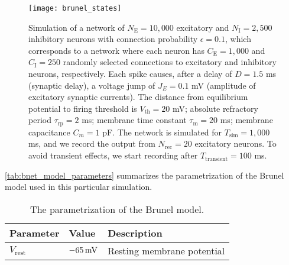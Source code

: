 \begin{figure}[H]
    \centering
    \texttt{[image: brunel\_states]}
    \caption{Simulation of a network of $N_\mathrm{E}=10,000$ excitatory and $N_\mathrm{I} = 2,500$ inhibitory neurons with connection probability $\epsilon = 0.1$, which corresponds to a network where each neuron has $C_\mathrm{E}=1,000$ and $C_\mathrm{I}=250$ randomly selected connections to excitatory and inhibitory neurons, respectively. Each spike causes, after a delay of $D=1.5$ ms (synaptic delay), a voltage jump of $J_E = 0.1$ mV (amplitude of excitatory synaptic currents). The distance from equilibrium potential to firing threshold is $V_\mathrm{th} = 20$ mV; absolute refractory period $\tau_\mathrm{rp} = 2$ ms; membrane time constant $\tau_\mathrm{m}=20$ ms; membrane capacitance $C_m = 1$ pF. The network is simulated for $T_\mathrm{sim} = 1,000$ ms, and we record the output from $N_\mathrm{rec} = 20$ excitatory neurons. To avoid transient effects, we start recording after $T_\mathrm{transient} = 100$ ms. 
    }
    \label{fig:brunel_states}
\end{figure}



\autoref{tab:bnet_model_parameters} summarizes the parametrization of the Brunel model used in this particular simulation.

\begin{table}[!htb]
  \caption{The parametrization of the Brunel model.}
  \begin{center}
    \begin{tabular}{lll}
      \toprule
      \textbf{Parameter} & \textbf{Value} & \textbf{Description} \\
      \midrule
      $V_\mathrm{rest}$ &  $-65 \,\mathrm{mV}$ & Resting membrane potential \\
      \bottomrule
    \end{tabular}
  \end{center}
  \label{tab:bnet_model_parameters}
\end{table}
